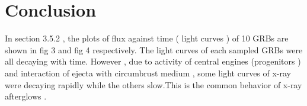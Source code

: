 \setcounter{chapter}{4}
\chapter{Conclusion}
\label{chap:5}
In section 3.5.2 ,  the  plots  of  flux  against  time ( light curves ) of  10  GRBs  are  shown  in  fig 3 and  fig 4  respectively. The  light  curves  of  each  sampled  GRBs   were  all  decaying   with   time. However ,  due  to  activity of central  engines (progenitors )  and   interaction  of ejecta  with  circumbrust medium , some light curves  of  x-ray  were   decaying  rapidly  while  the others  slow.This is the  common  behavior  of  x-ray afterglows .  
